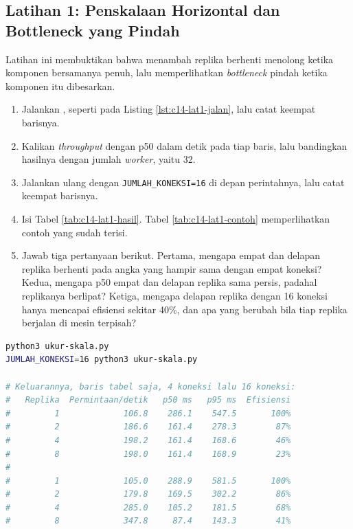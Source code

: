 \subsection*{Latihan 1: Penskalaan Horizontal dan Bottleneck yang Pindah}

Latihan ini membuktikan bahwa menambah replika berhenti menolong ketika
komponen bersamanya penuh, lalu memperlihatkan \textit{bottleneck} pindah
ketika komponen itu dibesarkan.

\begin{enumerate}
  \item Jalankan , seperti pada Listing
        \ref{lst:c14-lat1-jalan}, lalu catat keempat barisnya.
  \item Kalikan \textit{throughput} dengan p50 dalam detik pada tiap baris,
        lalu bandingkan hasilnya dengan jumlah \textit{worker}, yaitu 32.
  \item Jalankan ulang dengan \texttt{JUMLAH\_KONEKSI=16} di depan
        perintahnya, lalu catat keempat barisnya.
  \item Isi Tabel \ref{tab:c14-lat1-hasil}. Tabel \ref{tab:c14-lat1-contoh}
        memperlihatkan contoh yang sudah terisi.
  \item Jawab tiga pertanyaan berikut. Pertama, mengapa empat dan delapan
        replika berhenti pada angka yang hampir sama dengan empat koneksi?
        Kedua, mengapa p50 empat dan delapan replika sama persis, padahal
        replikanya berlipat? Ketiga, mengapa delapan replika dengan 16
        koneksi hanya mencapai efisiensi sekitar 40\%, dan apa yang berubah
        bila tiap replika berjalan di mesin terpisah?
\end{enumerate}

\begin{lstlisting}[language=bash, caption={Mengukur penskalaan dengan dua kapasitas basis data, tersedia di \berkas{sources/chapter14/ukur-skala.py}}, label={lst:c14-lat1-jalan}]
python3 ukur-skala.py
JUMLAH_KONEKSI=16 python3 ukur-skala.py

# Keluarannya, baris tabel saja, 4 koneksi lalu 16 koneksi:
#   Replika  Permintaan/detik   p50 ms   p95 ms  Efisiensi
#         1             106.8    286.1    547.5       100%
#         2             186.6    161.4    278.3        87%
#         4             198.2    161.4    168.6        46%
#         8             198.0    161.4    168.9        23%
#
#         1             105.0    288.9    581.5       100%
#         2             179.8    169.5    302.2        86%
#         4             285.0    105.2    181.5        68%
#         8             347.8     87.4    143.3        41%
\end{lstlisting}

